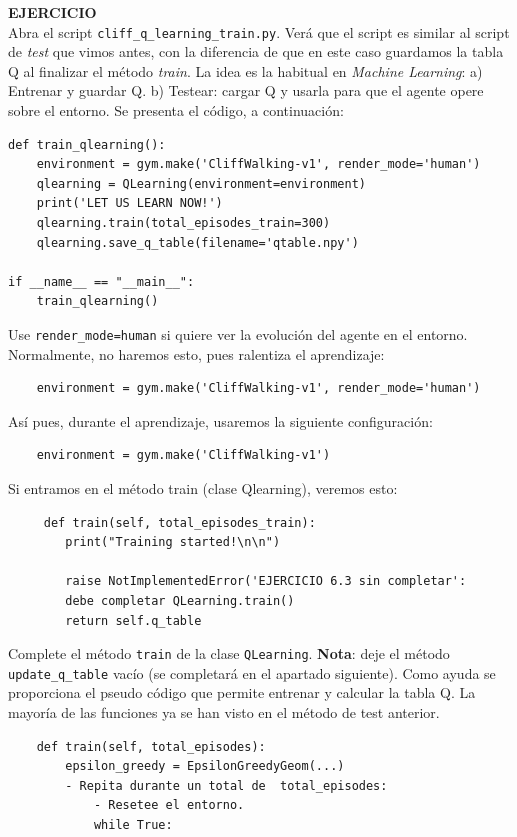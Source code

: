 \documentclass{article}
\begin{document}
\begin{exercise}[breakable]
\textbf{EJERCICIO}\\
Abra el script \texttt{cliff\_q\_learning\_train.py}. Verá que el script es similar al script de \textit{test} que vimos antes, con la diferencia de que en este caso guardamos la tabla Q al finalizar el método \emph{train}. La idea es la habitual en \textit{Machine Learning}: a) Entrenar y guardar Q. b) Testear: cargar Q y usarla para que el agente opere sobre el entorno. Se presenta el código, a continuación:
\begin{small}
\begin{verbatim}
def train_qlearning():    
    environment = gym.make('CliffWalking-v1', render_mode='human')
    qlearning = QLearning(environment=environment)
    print('LET US LEARN NOW!')
    qlearning.train(total_episodes_train=300)    
    qlearning.save_q_table(filename='qtable.npy')

if __name__ == "__main__":
    train_qlearning()    
\end{verbatim}
\end{small}

Use \texttt{render\_mode=human} si quiere ver la evolución del agente en el entorno. Normalmente, no haremos esto, pues ralentiza el aprendizaje:
\begin{verbatim}
    environment = gym.make('CliffWalking-v1', render_mode='human')
\end{verbatim}
Así pues, durante el aprendizaje, usaremos la siguiente configuración:
\begin{verbatim}    
    environment = gym.make('CliffWalking-v1')
\end{verbatim}
    





Si entramos en el método train (clase Qlearning), veremos esto:
\begin{small}
\begin{verbatim}
     def train(self, total_episodes_train):
        print("Training started!\n\n")

        raise NotImplementedError('EJERCICIO 6.3 sin completar': 
        debe completar QLearning.train()
        return self.q_table  
\end{verbatim}
\end{small}
    Complete el método \texttt{train} de la clase \texttt{QLearning}. \textbf{Nota}: deje el método \texttt{update\_q\_table} vacío (se completará en el apartado siguiente). Como ayuda se proporciona el pseudo código que permite entrenar y calcular la tabla Q. La mayoría de las funciones ya se han visto en el método de test anterior.
\begin{small}
\begin{verbatim}
    def train(self, total_episodes):
        epsilon_greedy = EpsilonGreedyGeom(...)
        - Repita durante un total de  total_episodes:
            - Resetee el entorno.
            while True: 
                

\end{verbatim}
\end{small}
\end{exercise}
\end{document}
